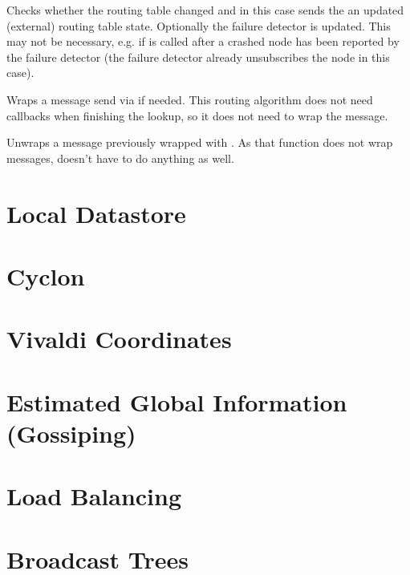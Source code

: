 Checks whether the routing table changed and in this case sends the
 an updated (external) routing table state. Optionally
the failure detector is updated. This may not be necessary, e.g. if
 is called after a crashed node has been reported by the failure
detector (the failure detector already unsubscribes the node in this case).


Wraps a message send via  if needed. This
routing algorithm does not need callbacks when finishing the lookup, so it
does not need to wrap the message.


Unwraps a message previously wrapped with
. As that function does not wrap messages,
 doesn't have to do anything as well.

\section{Local Datastore}

\section{Cyclon}

\section{Vivaldi Coordinates}

\section{Estimated Global Information (Gossiping)}

\section{Load Balancing}

\section{Broadcast Trees}
